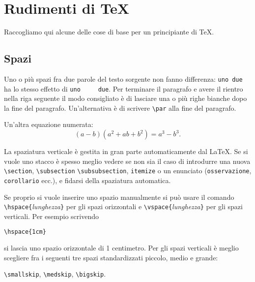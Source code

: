 
\chapter{Rudimenti di \TeX}

Raccogliamo qui alcune delle cose di base per un
principiante di \TeX.

\section{Spazi}

Uno o pi\`u spazi fra due parole del testo sorgente non
fanno differenza: \verb!uno due! ha lo stesso effetto
di \verb!uno     due!. Per terminare il
paragrafo e avere il rientro nella riga seguente il modo
consigliato \`e di lasciare una o pi\`u righe bianche dopo
la fine del paragrafo. Un'alternativa \`e di scrivere
\verb!\par! alla fine del paragrafo.

Un'altra equazione numerata:
\begin{equation}\label{prodottoNotevole2}
  (a-b)(a^2+ab+b^2)=a^3-b^3.
\end{equation}

La spaziatura verticale \`e gestita in gran parte
automaticamente dal \LaTeX. Se si vuole uno stacco \`e
spesso meglio vedere se non sia il caso di introdurre una
nuova \verb!\section!, \verb!\subsection!
\verb!\subsubsection!, \verb!itemize! o un enunciato
(\verb!osservazione!, \verb!corollario! ecc.), e fidarsi
della spaziatura automatica.

Se proprio si vuole inserire uno spazio manualmente si
pu\`o usare il comando
\verb!\hspace{!\textit{lunghezza}\verb!}! per gli spazi
orizzontali e \verb!\vspace{!\textit{lunghezza}\verb!}!
per gli spazi verticali. Per esempio scrivendo
\begin{center}
  \verb!\hspace{1cm}!
\end{center}
si lascia uno spazio orizzontale di 1 centimetro.
Per gli spazi verticali \`e meglio scegliere fra i
seguenti tre spazi standardizzati piccolo, medio e grande:
\begin{center}
  \verb!\smallskip!, \verb!\medskip!, \verb!\bigskip!.
\end{center}

